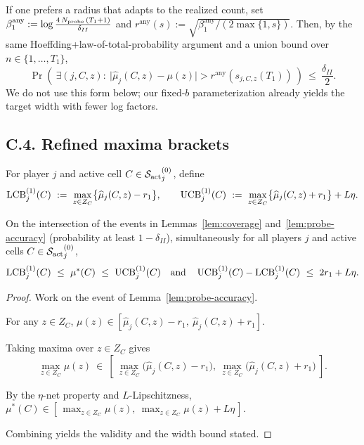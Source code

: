 \begin{remark}
\label{rem:anytime}
If one prefers a radius that adapts to the realized count, set
$\beta_1^{\mathrm{any}}:=\log\frac{4\,N_{\text{probe}}\,(T_1+1)}{\delta_{II}}$
and $r^{\mathrm{any}}(s):=\sqrt{\beta_1^{\mathrm{any}}/(2\max\{1,s\})}$.
Then, by the same Hoeffding+\;law-of-total-probability argument and a union bound over $n\in\{1,\dots,T_1\}$,
\[
\Pr\!\left(\ \exists (j,C,z):\ \big|\widehat\mu_j(C,z)-\mu(z)\big|> r^{\mathrm{any}}(s_{j,C,z}(T_1))\ \right)\ \le\ \frac{\delta_{II}}{2}.
\]
We do not use this form below; our fixed-$b$ parameterization already yields the target width with fewer log factors.
\end{remark}

\subsection*{C.4.\; Refined maxima brackets}

For player $j$ and active cell $C\in {\mathcal{S}_{\mathrm{act}}}^{(0)}_j$, define
\begin{equation}
\label{eq:phase2-brackets-def}
\operatorname{LCB}^{(1)}_j(C)\ :=\ \max_{z\in Z_C}\bigl\{\widehat\mu_j(C,z)-r_1\bigr\},
\qquad
\operatorname{UCB}^{(1)}_j(C)\ :=\ \max_{z\in Z_C}\bigl\{\widehat\mu_j(C,z)+r_1\bigr\} + L\eta.
\end{equation}

\begin{proposition}\label{prop:refined-bracket}
On the intersection of the events in Lemmas~\ref{lem:coverage} and~\ref{lem:probe-accuracy} (probability at least $1-\delta_{II}$), simultaneously for all players $j$ and active cells $C\in {\mathcal{S}_{\mathrm{act}}}^{(0)}_j$,
\[
\LCB^{(1)}_j(C)\ \le\ \mu^\ast(C)\ \le\ \UCB^{(1)}_j(C)
\quad\text{and}\quad
\UCB^{(1)}_j(C)-\LCB^{(1)}_j(C)\ \le\ 2r_1 + L\eta.
\]
\end{proposition}

\begin{proof}
Work on the event of Lemma~\ref{lem:probe-accuracy}. 

For any $z\in Z_C$,
$\mu(z)\in [\widehat\mu_j(C,z)-r_1,\ \widehat\mu_j(C,z)+r_1]$.

Taking maxima over $z\in Z_C$ gives
\[
\max_{z\in Z_C}\mu(z)\ \in\ \left[\ \max_{z\in Z_C}\bigl(\widehat\mu_j(C,z)-r_1\bigr),\ \max_{z\in Z_C}\bigl(\widehat\mu_j(C,z)+r_1\bigr)\ \right].
\]

By the $\eta$-net property and $L$-Lipschitzness, $\mu^\ast(C)\in [\,\max_{z\in Z_C}\mu(z),\ \max_{z\in Z_C}\mu(z)+L\eta\,]$.

Combining yields the validity and the width bound stated.
\end{proof}

